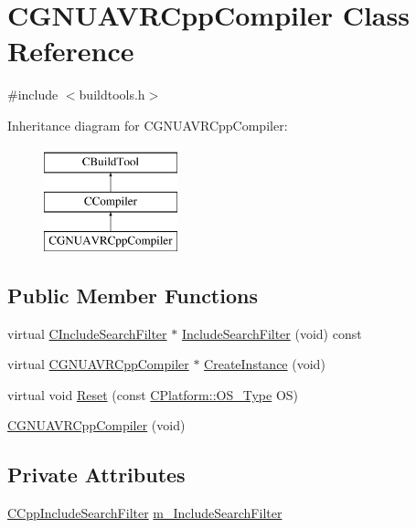 \hypertarget{classCGNUAVRCppCompiler}{\section{C\-G\-N\-U\-A\-V\-R\-Cpp\-Compiler Class Reference}
\label{classCGNUAVRCppCompiler}
}


{\ttfamily \#include $<$buildtools.\-h$>$}

Inheritance diagram for C\-G\-N\-U\-A\-V\-R\-Cpp\-Compiler\-:\begin{figure}[H]
\begin{center}
\leavevmode
\includegraphics[height=3.000000cm]{d3/de1/classCGNUAVRCppCompiler}
\end{center}
\end{figure}
\subsection*{Public Member Functions}
\begin{DoxyCompactItemize}
\item 
virtual \hyperlink{classCIncludeSearchFilter}{C\-Include\-Search\-Filter} $\ast$ \hyperlink{classCGNUAVRCppCompiler_aae41e83908ef6be8ae274f75fb6a1cbe}{Include\-Search\-Filter} (void) const 
\item 
virtual \hyperlink{classCGNUAVRCppCompiler}{C\-G\-N\-U\-A\-V\-R\-Cpp\-Compiler} $\ast$ \hyperlink{classCGNUAVRCppCompiler_ac38cdc207e9dce42f53fef90ebaa3b87}{Create\-Instance} (void)
\item 
virtual void \hyperlink{classCGNUAVRCppCompiler_a3c597b2862b70725bcbc2d518c90f7bd}{Reset} (const \hyperlink{classCPlatform_a2fb735c63c53052f79629e338bb0f535}{C\-Platform\-::\-O\-S\-\_\-\-Type} O\-S)
\item 
\hyperlink{classCGNUAVRCppCompiler_aad034948d78174a0bbaa388d6ae7f4c5}{C\-G\-N\-U\-A\-V\-R\-Cpp\-Compiler} (void)
\end{DoxyCompactItemize}
\subsection*{Private Attributes}
\begin{DoxyCompactItemize}
\item 
\hyperlink{classCCppIncludeSearchFilter}{C\-Cpp\-Include\-Search\-Filter} \hyperlink{classCGNUAVRCppCompiler_aa6e99a6249279f771b338b09697f17ec}{m\-\_\-\-Include\-Search\-Filter}
\end{DoxyCompactItemize}

